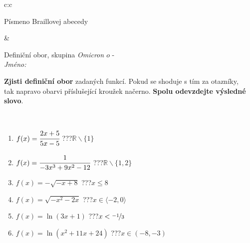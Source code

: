 \documentclass[10pt]{report}
\newcommand\omicron{o}
\begin{document}
\begin{tabular}{c:c}
\begin{minipage}[c][104.5mm][t]{0.5\linewidth}
\begin{center}
\begin{minipage}{0.20\linewidth}
\begin{center}
{\small Písmeno Braillovej abecedy}
\end{center}
\end{minipage}
\end{center}
\end{minipage}
&
\begin{minipage}[c][104.5mm][t]{0.5\linewidth}
\begin{center}
\vspace{7mm}
{\huge Definiční obor, skupina \textit{Omicron $\omicron$} -}\\[5mm]
\textit{Jméno:}\phantom{xxxxxxxxxxxxxxxxxxxxxxxxxxxxxxxxxxxxxxxxxxxxxxxxxxxxxxxxxxxxxxxxx}\\[5mm]
\begin{minipage}{0.95\linewidth}
\begin{center}
\textbf{Zjisti definiční obor} zadaných funkcí. Pokud se shoduje s tím za otazníky,\\tak napravo obarvi příslušející kroužek načerno. \textbf{Spolu odevzdejte výsledné slovo}.
\end{center}
\end{minipage}
\\[1mm]
\begin{minipage}{0.79\linewidth}
\begin{center}
\begin{varwidth}{\linewidth}
\begin{enumerate}
\normalsizerrr
\item $f(x)=\cfrac{2x+5}{5x-5}$\quad \dotfill\; ???\;\dotfill \quad $\mathbb{R}\smallsetminus\{1\}$
\item $f(x)=\cfrac{1}{-3x^3+9x^2-12}$\quad \dotfill\; ???\;\dotfill \quad $\mathbb{R}\smallsetminus\{1,2\}$
\item $f(x)=-\sqrt{-x+8}$\quad \dotfill\; ???\;\dotfill \quad $x\leq8$
\item $f(x)=\sqrt{-x^2-2x}$\quad \dotfill\; ???\;\dotfill \quad $x\in\langle-2 , 0\rangle$
\item $f(x)=\ln{(3x+1)}$\quad \dotfill\; ???\;\dotfill \quad $x<\nicefrac{-1}{3}$
\item $f(x)=\ln{(x^2+11x+24)}$\quad \dotfill\; ???\;\dotfill \quad $x\in(-8 , -3)$
\end{enumerate}
\end{varwidth}
\end{center}
\end{minipage}
\begin{minipage}{0.20\linewidth}
\begin{center}

\end{center}
\end{minipage}
\end{center}
\end{minipage}
\end{tabular}
\end{document}

